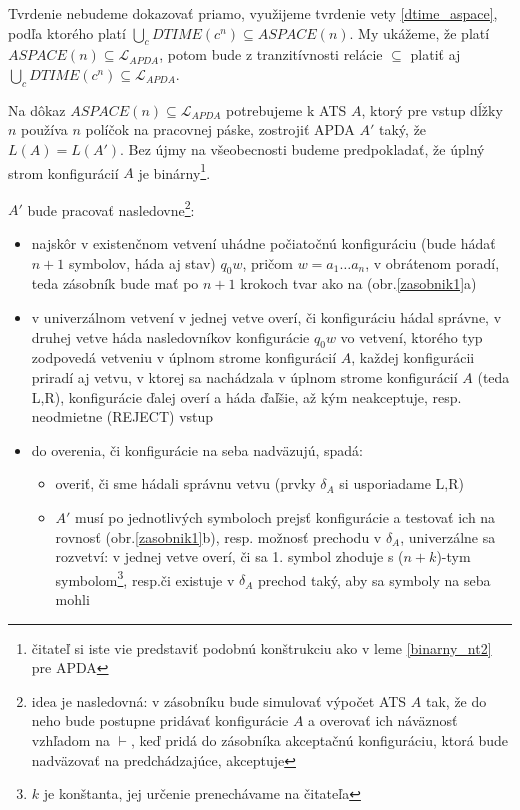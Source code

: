 \begin{dokaz}
Tvrdenie nebudeme dokazovať priamo, využijeme tvrdenie vety
\ref{dtime_aspace}, podľa ktorého platí $\underset{c}{\bigcup}
DTIME(c^n)\subseteq ASPACE(n)$. My ukážeme, že platí
$ASPACE(n)\subseteq\mathcal{L}_{APDA}$, potom bude z tranzitívnosti
relácie $\subseteq$ platiť aj
$\underset{c}{\bigcup}DTIME(c^n)\subseteq\mathcal{L}_{APDA}$.

\smallskip
Na dôkaz $ASPACE(n)\subseteq\mathcal{L}_{APDA}$ potrebujeme k
ATS $A$, ktorý pre vstup dĺžky $n$ používa $n$ políčok na
pracovnej páske, zostrojiť APDA $A'$ taký, že
$L(A)=L(A')$. Bez újmy na všeobecnosti budeme predpokladať, že
úplný strom konfigurácií $A$ je binárny\footnote{čitateľ si
iste vie predstaviť podobnú konštrukciu ako v leme
\ref{binarny_nt2} pre APDA}.

\smallskip
$A'$ bude pracovať nasledovne\footnote{idea je nasledovná: v
zásobníku bude simulovať výpočet ATS $A$ tak, že do neho bude
postupne pridávať konfigurácie $A$ a overovať ich náväznosť
vzhľadom na $\vdash$, keď pridá do zásobníka akceptačnú
konfiguráciu, ktorá bude nadväzovať na predchádzajúce, akceptuje}:
\begin{itemize}
\item najskôr v existenčnom vetvení uhádne počiatočnú
konfiguráciu (bude hádať $n+1$ symbolov, háda aj stav) $q_0w$,
pričom $w=a_1\dots a_n$, v obrátenom poradí, teda zásobník bude
mať po $n+1$ krokoch tvar ako na (obr.\ref{zasobnik1}a)
\item v univerzálnom vetvení v jednej vetve overí, či konfiguráciu
hádal správne, v druhej vetve háda nasledovníkov konfigurácie
$q_0w$ vo vetvení, ktorého typ zodpovedá vetveniu v úplnom strome
konfigurácií $A$, každej konfigurácii priradí aj vetvu, v ktorej
sa nachádzala v úplnom strome konfigurácií $A$ (teda L,R),
konfigurácie ďalej overí a háda ďaľšie, až kým neakceptuje, resp.
neodmietne (REJECT) vstup
\item do overenia, či konfigurácie na seba nadväzujú, spadá:
\begin{itemize}
\item overiť, či sme hádali správnu vetvu (prvky $\delta_A$
si usporiadame L,R)
\item $A'$ musí po jednotlivých symboloch prejsť konfigurácie a
testovať ich na rovnosť (obr.\ref{zasobnik1}b), resp. možnosť
prechodu v $\delta_A$, univerzálne sa rozvetví: v jednej vetve
overí, či sa 1. symbol zhoduje s ($n+k$)-tym symbolom\footnote{$k$
je konštanta, jej určenie prenechávame na čitateľa}, resp.či
existuje v $\delta_A$ prechod taký, aby sa symboly na seba mohli

\end{itemize}
\end{itemize}
\end{dokaz}

